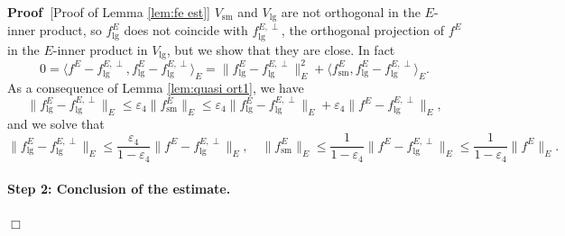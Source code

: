 \documentclass[11pt,a4paper]{article}
\numberwithin{equation}{section}
\newcommand{\tmop}[1]{\ensuremath{\operatorname{#1}}}
\newenvironment{proof}{\noindent\textbf{Proof\ }}{\hspace*{\fill}$\Box$\medskip}
\begin{document}
\begin{proof}[Proof of Lemma \ref{lem:fe est}]
    $V_{\tmop{sm}}$ and $V_{\tmop{lg}}$ are not orthogonal in the $E$-inner product, so $f^E_{\tmop{lg}}$ does not coincide with $f^{E,\perp}_{\tmop{lg}}$, the orthogonal projection of $f^E$ in the $E$-inner product in $V_{\tmop{lg}}$, but we show that they are close. In fact\begin{equation*}
    0=\langle f^E-f^{E,\perp}_{\tmop{lg}}, f^E_{\tmop{lg}}-f^{E,\perp}_{\tmop{lg}} \rangle_{E}=\|f^E_{\tmop{lg}}-f^{E,\perp}_{\tmop{lg}} \|^2_{E}+\langle f^E_{\tmop{sm}}, f^E_{\tmop{lg}}-f^{E,\perp}_{\tmop{lg}} \rangle_{E}.
\end{equation*}As a consequence of Lemma \ref{lem:quasi ort1}, we have \begin{equation*}
    \|f^E_{\tmop{lg}}-f^{E,\perp}_{\tmop{lg}} \|_{E}\leqslant\varepsilon_4\| f^E_{\tmop{sm}}\|_{E}\leqslant\varepsilon_4\| f^E_{\tmop{lg}}-f^{E,\perp}_{\tmop{lg}} \|_{E}+\varepsilon_4\| f^E-f^{E,\perp}_{\tmop{lg}}\|_{E},
\end{equation*}
and we solve  that 
\begin{equation}
    \|f^E_{\tmop{lg}}-f^{E,\perp}_{\tmop{lg}} \|_{E}\leqslant\frac{\varepsilon_4}{1-\varepsilon_4}\| f^E-f^{E,\perp}_{\tmop{lg}}\|_{E},\quad \|f^E_{\tmop{sm}}\|_{E}\leqslant\frac{1}{1-\varepsilon_4}\| f^E-f^{E,\perp}_{\tmop{lg}}\|_{E}\leqslant\frac{1}{1-\varepsilon_4}\| f^E\|_{E}.\label{h_proj_1}
\end{equation}
 \paragraph{Step 2: Conclusion of the estimate.}


\end{proof}
\end{document}

